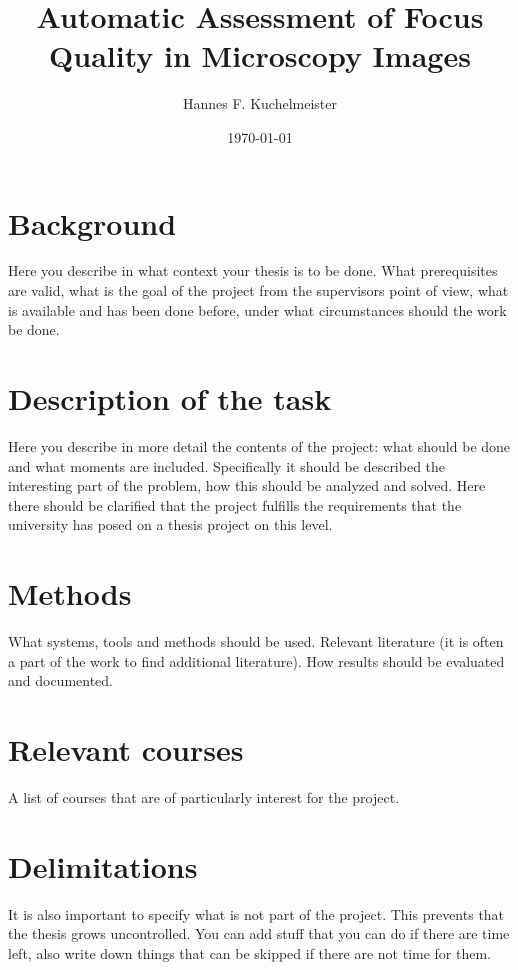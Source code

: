 \documentclass[a4paper,11pt]{article}
\title{Automatic Assessment of Focus Quality in Microscopy Images}
\author{Hannes F. Kuchelmeister}
\date{\today}
\begin{document}
\maketitle
\newpage



\section{Background}

Here you describe in what context your thesis is to be done. What prerequisites are valid, what is the goal of the project from the supervisors point of view, what is available and has been done before, under what circumstances should the work be done.

\section{Description of the task}

Here you describe in more detail the contents of the project: what should be done and what moments are included. Specifically it should be described the interesting part of the problem, how this should be analyzed and solved. Here there should be clarified that the project fulfills the requirements that the university has posed on a thesis project on this level.

\section{Methods}

What systems, tools and methods should be used. Relevant literature (it is often a part of the work to find additional literature). How results should be evaluated and documented.

\section{Relevant courses}

A list of courses that are of particularly interest for the project.

\section{Delimitations}

It is also important to specify what is not part of the project. This prevents that the thesis grows uncontrolled. You can add stuff that you can do if there are time left, also write down things that can be skipped if there are not time for them.
\end{document}
